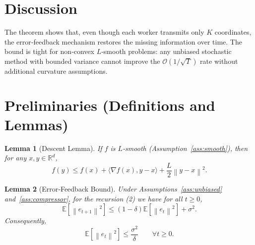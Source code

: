 \documentclass[11pt]{article}
\newtheorem{lemma}{Lemma}
\newcommand{\E}{\mathbb{E}}
\newcommand{\R}{\mathbb{R}}
\newcommand{\norm}[1]{\left\|#1\right\|}
\newcommand{\inner}[2]{\langle #1,#2\rangle}
\newcommand{\grad}{\nabla}
\begin{document}
\section*{Discussion}
The theorem shows that, even though each worker transmits only $K$ coordinates, the error‑feedback mechanism restores the missing information over time. The bound is tight for non‑convex $L$‑smooth problems: any unbiased stochastic method with bounded variance cannot improve the $\mathcal O(1/\sqrt{T})$ rate without additional curvature assumptions.

\newpage
\section*{Preliminaries (Definitions and Lemmas)}
\begin{lemma}[Descent Lemma]\label{lem:descent}
If $f$ is $L$‑smooth (Assumption~\ref{ass:smooth}), then for any $x,y\in\R^{d}$,
\[
f(y)\le f(x)+\inner{\grad f(x)}{y-x}+\frac{L}{2}\norm{y-x}^{2}.
\]
\end{lemma}
\begin{lemma}[Error‑Feedback Bound]\label{lem:error-bound}
Under Assumptions~\ref{ass:unbiased} and~\ref{ass:compressor}, for the recursion (2) we have for all $t\ge0$,
\[
\E\!\left[\norm{e_{t+1}}^{2}\right]\le (1-\delta)\E\!\left[\norm{e_{t}}^{2}\right]+\sigma^{2}.
\]
Consequently,
\[
\E\!\left[\norm{e_{t}}^{2}\right]\le\frac{\sigma^{2}}{\delta}\qquad\forall t\ge0.
\tag{6}
\]
\end{lemma}
\end{document}
